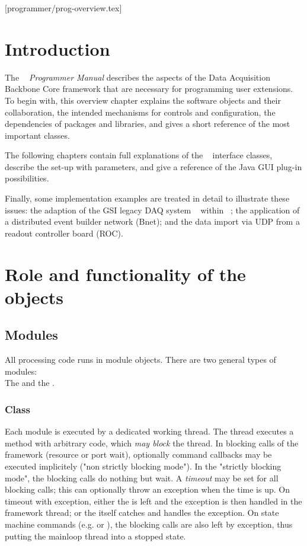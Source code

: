 [programmer/prog-overview.tex]
\section{Introduction}
The {\em \dabc~ Programmer Manual} 
describes the aspects of the Data Acquisition Backbone Core
framework that are necessary for programming user extensions.
To begin with, this overview chapter explains the
software objects and their collaboration, 
the intended mechanisms for controls and configuration, the dependencies of
packages and libraries, and gives a short reference of the most important classes.

The following chapters contain full explanations of the \dabc~ interface classes, 
describe the set-up with parameters, and give a reference of the Java GUI plug-in possibilities.

Finally, some implementation examples are treated in detail to illustrate these issues:
the adaption of the GSI legacy DAQ system \mbs~ within  \dabc~; the application of a distributed
event builder network (Bnet); and the data import via UDP from a readout controller board (ROC). 

\section{Role and  functionality of the objects}
\subsection{Modules}
\label{prog_overview_modules}
All processing code runs in module objects. 
There are two general types of modules: \\
The  and the . 
\subsubsection{Class } 
Each module is executed by a 
dedicated working thread. The thread executes a
 method  with arbitrary code, which {\sl may block} 
the thread. In blocking calls of the framework (resource or 
port wait), optionally command callbacks may be executed 
implicitely ("non strictly blocking mode"). In the "strictly 
blocking mode", the blocking calls do nothing but wait. 
A {\sl timeout} may be set for all blocking calls; this can 
optionally throw an exception when the time is up. On timeout 
with exception, either the  is left and the exception 
is then handled in the framework thread; or the  itself 
catches and handles the exception. On state machine commands (e.g. 
 or ), the blocking calls are also left by exception, 
thus putting the mainloop thread into a stopped state.

